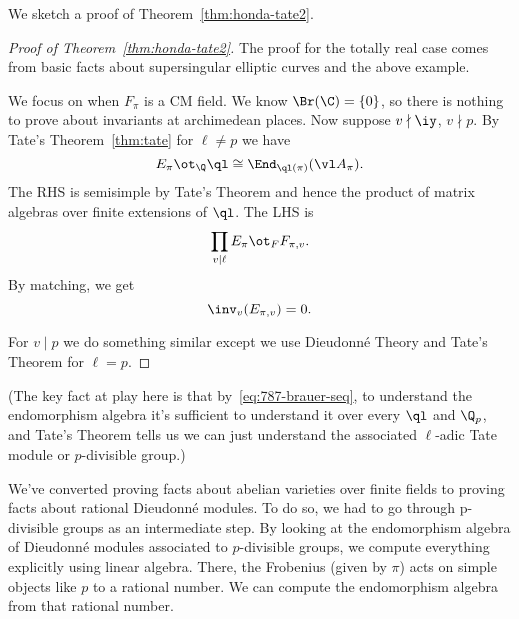 We sketch a proof of Theorem~\ref{thm:honda-tate2}.
\begin{proof}[Proof of Theorem~\ref{thm:honda-tate2}]
The proof for the totally real case comes from basic facts about supersingular elliptic curves and the above example.

We focus on when $F_{\pi}$ is a CM field. We know $\Br(\C)=\{0\}$, so there is nothing to prove about invariants at archimedean places. %
Now suppose $v\nmid \iy$, $v\nmid p$. By Tate's Theorem~\ref{thm:tate} for $\ell\ne p$ we have
\[
E_{\pi}\ot_{\Q}\ql \cong \End_{\ql(\pi)}(\vl A_{\pi}).
\]
The RHS is semisimple by Tate's Theorem and hence the product of matrix algebras over finite extensions of $\ql$.
The LHS is
\[
\prod_{v\mid \ell} E_{\pi}\ot_F F_{\pi,v}.
\]
By matching, we get 
\[
\inv_v(E_{\pi,v})=0.
\]

For $v\mid p$ we do something similar except we use Dieudonn\'e Theory and Tate's Theorem for $\ell=p$.
\end{proof}
(The key fact at play here is that by~\eqref{eq:787-brauer-seq}, to understand the endomorphism algebra it's sufficient to understand it over every $\ql$ and $\Q_p$, and Tate's Theorem tells us we can just understand the associated $\ell$-adic Tate module or $p$-divisible group.)

We've converted proving facts about abelian varieties over finite fields to proving facts about rational Dieudonn\'e modules. To do so, we had to go through p-divisible groups as an intermediate step. %
By looking at the endomorphism algebra of Dieudonn\'e modules associated to $p$-divisible groups, we compute everything explicitly using linear algebra. There, the Frobenius (given by $\pi$) acts 
on simple objects like $p$ to a rational number. We can compute the endomorphism algebra from that rational number. 



